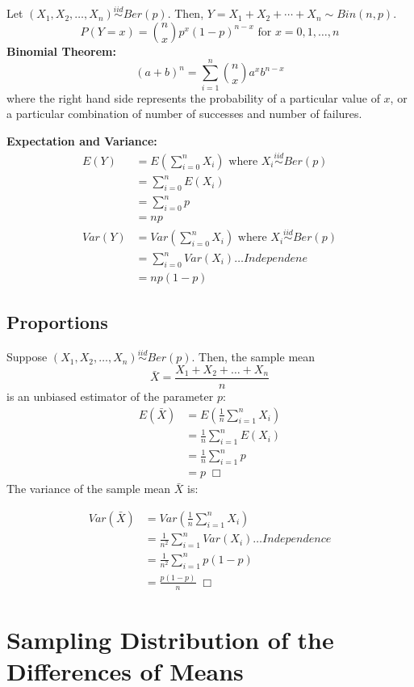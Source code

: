 \documentclass[
]{article}
\begin{document}
Let \((X_1, X_2, \dots, X_n) \stackrel{iid}{\sim}Ber(p)\). Then,
\(Y = X_1 + X_2 + \cdots + X_n \sim Bin(n, p)\).
\[P(Y = x) =\binom{n}{x}p^x (1-p)^{n-x} \text{ for } x = 0, 1, \dots, n\]
\textbf{Binomial Theorem:}
\[ (a +b)^n = \sum^n_{i=1}\binom{n}{x}a^xb^{n-x}\] where the right hand
side represents the probability of a particular value of \(x\), or a
particular combination of number of successes and number of failures.

\textbf{Expectation and Variance:} \[
\begin{aligned} 
E(Y) &= E(\sum^n_{i=0} X_i) \text{ where } X_i \stackrel{iid}{\sim} Ber(p) \\
&=\sum^n_{i=0}  E(X_i)\\
&= \sum^n_{i=0} p \\
&= np\\
Var(Y) &= Var(\sum^n_{i=0} X_i) \text{ where } X_i \stackrel{iid}{\sim} Ber(p) \\
&=\sum^n_{i=0}  Var(X_i) \dots Independene\\
&= np(1-p)
\end{aligned}
\]

\hypertarget{proportions}{%
\subsection{Proportions}\label{proportions}}

Suppose \((X_1, X_2, \dots, X_n) \stackrel{iid}{\sim}Ber(p)\). Then, the
sample mean \[\bar{X} = \frac{ X_1 + X_2 + \dots + X_n}{n}\] is an
unbiased estimator of the parameter \(p\): \[\begin{aligned}
E(\bar{X}) &= E(\frac{1}{n} \sum^n_{i=1} X_i) \\
&= \frac{1}{n} \sum^n_{i=1} E(X_i) \\
&= \frac{1}{n} \sum^n_{i=1} p \\
&= p \; \Box
\end{aligned}\] The variance of the sample mean \(\bar{X}\) is:

\[\begin{aligned}
Var(\bar{X}) &= Var(\frac{1}{n} \sum^n_{i=1} X_i) \\
&= \frac{1}{n^2} \sum^n_{i=1} Var(X_i) \dots Independence \\
&= \frac{1}{n^2} \sum^n_{i=1} p(1-p) \\
&= \frac{p(1-p)}{n} \; \Box
\end{aligned}\]

\hypertarget{sampling-distribution-of-the-differences-of-means}{%
\section{Sampling Distribution of the Differences of
Means}\label{sampling-distribution-of-the-differences-of-means}}
\end{document}
